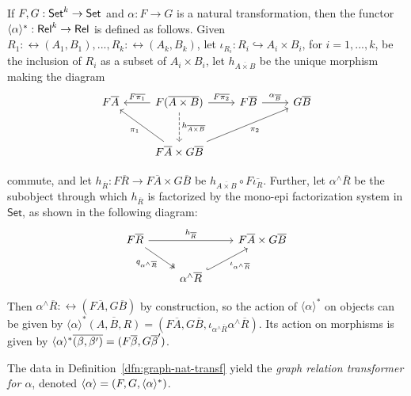 \documentclass[runningheads]{llncs}
\newcommand{\set}{\mathsf{Set}}
\begin{document}
\begin{definition}\label{def:graph-nat-transf}
If $F, G: \mathsf{Set}^k \to \mathsf{Set}$
and $\alpha : F \to G$ is a natural transformation, then the functor
$\langle {\alpha} \rangle^*: \mathsf{Rel}^k \to \mathsf{Rel}$ is defined as follows. Given $R_1
: \rel(A_1, B_1),...,R_k : \rel(A_k,B_k)$, let $\iota_{R_i} : R_i
\hookrightarrow A_i \times B_i$, for $i = 1,...,k$, be the inclusion
of $R_i$ as a subset of $A_i \times B_i$,
let $h_{\overline{A \times B}}$ be the unique morphism making the diagram
{\footnotesize\[\begin{tikzcd}[row sep = large]
        F\overline{A}
        &F(\overline{A \times B})
        \ar[l, "{F\overline{\pi_1}}"']
        \ar[r, "{F\overline{\pi_2}}"]
        \ar[d, dashed, "{h_{\overline{A \times B}}}"]
        &F\overline{B}
        \ar[r, "{\alpha_{\ol{B}}}"]
        &G\overline{B} \\
        &F\overline{A} \times G\overline{B}
        \ar[ul, "{\pi_1}"] \ar[urr, "{\pi_2}"']
\end{tikzcd}\]}

\noindent
commute, and let $h_{\overline{R}} : F\overline{R} \to F\overline{A}
\times G\overline{B}$ be $h_{\overline{A \times B}} \circ
F\overline{\iota_R}$. Further, let $\alpha^\wedge\overline{R}$ be the
subobject through which $h_{\overline{R}}$ is factorized by the
mono-epi factorization system in $\set$, as shown in the
following diagram:
{\footnotesize\[\begin{tikzcd}
        F\overline{R}
        \ar[rr, "{h_{\overline{R}}}"]
        \ar[dr, twoheadrightarrow, "{q_{\alpha^\wedge\overline{R}}}"']
        &&F\overline{A} \times G\overline{B} \\
        &\alpha^\wedge\overline{R}
        \ar[ur, hookrightarrow, "{\iota_{\alpha^\wedge\overline{R}}}"']
\end{tikzcd}\]}

\noindent
Then $\alpha^\wedge\overline{R} : \rel(F\overline{A}, G\overline{B})$
by construction, so the action of $\langle \alpha \rangle^*$ on
objects can be given by $\langle \alpha \rangle^* \overline{(A,B,R)} =
(F\overline{A}, G\overline{B}, \iota_{\alpha^\wedge
  \overline{R}}\alpha^\wedge\overline{R})$. Its action on morphisms is
given by $\langle {\alpha} \rangle^*\overline{(\beta, \beta')} =
(F\overline\beta, G\overline\beta')$.
\end{definition}

The data in Definition~\ref{dfn:graph-nat-transf} yield the {\em graph relation
transformer for $\alpha$}, denoted $\langle {\alpha} \rangle = (F, G,
\langle {\alpha} \rangle^*)$.
\end{document}
